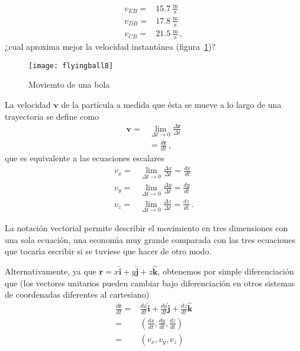 \begin{align}
  v_{EB}=&15.7\ \frac{\text{m}}{\text{s}}\nonumber\\
  v_{DB}=&17.8\ \frac{\text{m}}{\text{s}}\nonumber\\
  v_{CB}=&21.5\ \frac{\text{m}}{\text{s}}\,,
\end{align}
¿cual aproxima mejor la velocidad instantánea (figura~\ref{fig:flyingball8})?

\begin{figure}
  \centering
  \texttt{[image: flyingball8]}
  \caption{Moviemto de una bola}
  \label{fig:flyingball8}
\end{figure}


La velocidad $\mathbf{v}$ de la partícula a medida que ésta se mueve a lo largo de una trayectoria se define como
\begin{align}
  \mathbf{v}=&\lim_{\Delta t\to0}\frac{\Delta\mathbf{r}}{\Delta t}\nonumber\\
  &=\frac{d\mathbf{r}}{dt}\,,
\end{align}
que es equivalente a las ecuaciones escalares
\begin{align}
  v_x=&\lim_{\Delta t\to0}\frac{\Delta x}{\Delta t}=\frac{dx}{dt}\nonumber\\
  v_y=&\lim_{\Delta t\to0}\frac{\Delta y}{\Delta t}=\frac{dy}{dt}\nonumber\\
  v_z=&\lim_{\Delta t\to0}\frac{\Delta z}{\Delta t}=\frac{dz}{dt}\,.
\end{align}

La notaci\'on vectorial permite describir el movimiento en tres dimensiones con una sola ecuaci\'on, una econom\'\i a muy grande comparada con las tres ecuaciones que tocar\'\i a escribir si se tuviese que hacer de otro modo. 

Alternativamente, ya que $\mathbf{r}=x\hat{\mathbf{i}}+
y\hat{\mathbf{j}}+z\hat{\mathbf{k}}$, obtenemos por simple
diferenciaci\'on que (los vectores unitarios pueden cambiar bajo
diferenciaci\'on en otros sistemas de coordenadas diferentes al
cartesiano)
\begin{align}
 \frac{d\mathbf{r}}{dt}=&\frac{dx}{dt}\hat{\mathbf{i}}   
+\frac{dy}{dt}\hat{\mathbf{j}}   +\frac{dz}{dt}\hat{\mathbf{k}}\nonumber\\
=&
\left(
\frac{dx}{dt},\frac{dy}{dt},\frac{dz}{dt}
\right)\nonumber\\
=&(v_x,v_y,v_z)
\end{align}




